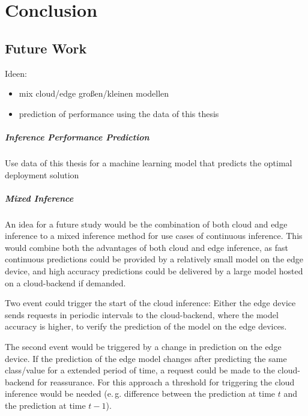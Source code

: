 \chapter{Conclusion}
\label{chap:conclusion}
%
\section{Future Work}
Ideen:
\begin{itemize}
    \item mix cloud/edge großen/kleinen modellen
    \item prediction of performance using the data of this thesis
\end{itemize}
\paragraph{Inference Performance Prediction}
Use data of this thesis for a machine learning model that predicts the optimal deployment solution
\paragraph{Mixed Inference}
An idea for a future study would be the combination of both cloud and edge inference to a mixed inference method for use cases of continuous inference.
This would combine both the advantages of both cloud and edge inference, as fast continuous predictions could be provided by a relatively small model on the edge device, and high accuracy predictions could be delivered by a large model hosted on a cloud-backend if demanded. 

Two event could trigger the start of the cloud inference: 
Either the edge device sends requests in periodic intervals to the cloud-backend, where the model accuracy is higher, to verify the prediction of the model on the edge devices.

The second event would be triggered by a change in prediction on the edge device. If the prediction of the edge model changes after predicting the same class/value for a extended period of time, a request could be made to the cloud-backend for reassurance. For this approach a threshold for triggering the cloud inference would be needed (e.\,g. difference between the prediction at time $t$ and the prediction at time $t-1$).



